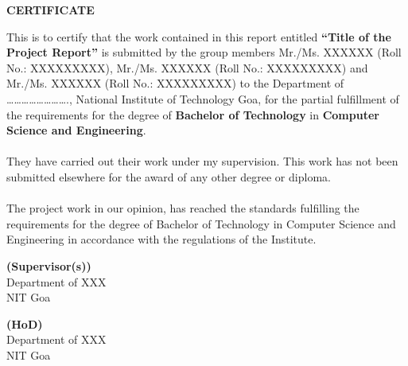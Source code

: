 \documentclass[a4paper,12pt]{report}
\begin{document}
\vspace{-13mm}
\begin{center}
\begin{normalsize}
\textbf{CERTIFICATE}\end{normalsize}
\end{center}
\vspace{0.3cm}
\noindent This is to certify that the work contained in this report entitled \textbf{“Title of the Project Report”} is submitted by the group members Mr./Ms. XXXXXX (Roll No.: XXXXXXXXX), Mr./Ms. XXXXXX (Roll No.: XXXXXXXXX) and Mr./Ms. XXXXXX (Roll No.: XXXXXXXXX) to the Department of ……………………., National Institute of Technology Goa, for the partial fulfillment of the requirements for the degree of \textbf{Bachelor of Technology} in \textbf{Computer Science and Engineering}.\\
\\
They have carried out their work under my supervision. This work has not been submitted elsewhere for the award of any other degree or diploma.\\
\\
The project work in our opinion, has reached the standards fulfilling the requirements for the degree of Bachelor of Technology in Computer Science and Engineering in accordance with the regulations of the Institute.
\vspace{2cm}
\begin{flushleft}
\textbf{(Supervisor(s))}\\ Department of XXX\\ NIT Goa
\end{flushleft}
\begin{flushright}
\vspace{1.3cm}
\textbf{(HoD)}\\ Department of XXX\\ NIT Goa
\end{flushright}
\pagebreak
\end{document}
